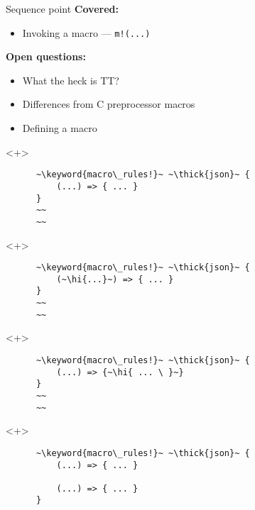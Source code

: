 \documentclass[usepdftitle=false,aspectratio=169]{beamer}
\newcommand{\thick}[1]{\contourlength{0.16pt}\contour[10]{black}{#1}}
\newcommand{\hi}[1]{%
\tikz[baseline=(A.base)]
 \node[highlighting=yellowbg,inner sep=0pt,text depth=0pt] (A) {#1};%
}
\newcommand{\keyword}[1]{\color{greenish}#1}
\begin{document}
\begin{frame}[fragile]{Sequence point}
  \setlength{\leftmargini}{50pt}
  \vspace{10pt}
  \textbf{\large Covered:}
  \begin{itemize}[label=\footnotesize{},labelsep=10pt]
  \vspace{-4pt}
  \item Invoking a macro --- \texttt{m!(...)}
  \end{itemize}
  \vspace{10pt}
  \textbf{\large Open questions:}
  \begin{itemize}[label=\footnotesize{},labelsep=10pt]
  \vspace{-4pt}
  \item What the heck is TT?
  \vspace{-4pt}
  \item Differences from C preprocessor macros
  \vspace{-4pt}
  \item Defining a macro
  \end{itemize}
\end{frame}

\begin{frame}[fragile]
  \begin{onlyenv}<+>
    \begin{verbatim}
      ~\keyword{macro\_rules!}~ ~\thick{json}~ {
          (...) => { ... }
      }
      ~~
      ~~
    \end{verbatim}
  \end{onlyenv}
  \begin{onlyenv}<+>
    \begin{verbatim}
      ~\keyword{macro\_rules!}~ ~\thick{json}~ {
          (~\hi{...}~) => { ... }
      }
      ~~
      ~~
    \end{verbatim}
  \end{onlyenv}
  \begin{onlyenv}<+>
    \begin{verbatim}
      ~\keyword{macro\_rules!}~ ~\thick{json}~ {
          (...) => {~\hi{ ... \ }~}
      }
      ~~
      ~~
    \end{verbatim}
  \end{onlyenv}
  \begin{onlyenv}<+>
    \begin{verbatim}
      ~\keyword{macro\_rules!}~ ~\thick{json}~ {
          (...) => { ... }

          (...) => { ... }
      }
    \end{verbatim}
  \end{onlyenv}
\end{frame}
\end{document}
